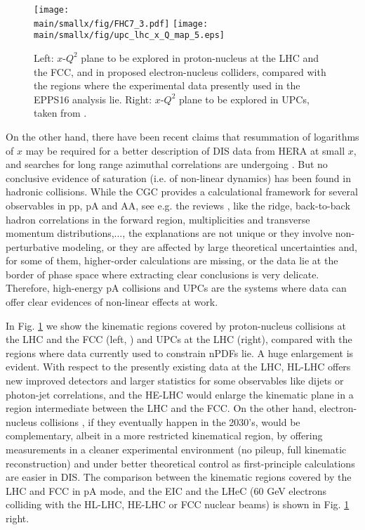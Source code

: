 \documentclass[../report.tex]{subfiles}
\providecommand{\main}{..}
\begin{document}
\begin{figure}[htb]
\centering
\texttt{[image: \\main/smallx/fig/FHC7\_3.pdf]} \hfill \texttt{[image: \\main/smallx/fig/upc\_lhc\_x\_Q\_map\_5.eps]}
\caption{Left: $x$-$Q^2$ plane to be explored in proton-nucleus at the LHC and the FCC, and in  proposed electron-nucleus colliders, compared with the regions where the experimental data presently used in the EPPS16 analysis \cite{Eskola:2016oht} lie. Right: $x$-$Q^2$ plane to be explored in UPCs, taken from \cite{Baltz:2007kq}.}
\label{fig:smallx1}
\end{figure}

On the other hand, there have been recent claims \cite{Ball:2017otu,Abdolmaleki:2018jln} that resummation of logarithms of $x$ may be required for a better description of DIS data from HERA at small $x$, and searches for long range azimuthal correlations are undergoing \cite{zeusichep2018}. But no conclusive evidence of saturation (i.e. of non-linear dynamics) has been found in hadronic collisions. While the CGC provides a calculational framework for several observables in pp, pA and AA, see e.g. the reviews \cite{Albacete:2013tpa,Lappi:2015jka}, like the ridge, back-to-back hadron correlations in the forward region, multiplicities and transverse momentum distributions,$\dots$,  the explanations are not unique or they involve non-perturbative modeling, or they are affected by large theoretical uncertainties and, for some of them, higher-order calculations are missing, or the data lie at the border of phase space where extracting clear conclusions is very delicate. Therefore, high-energy pA collisions and UPCs are the systems where data can offer clear evidences of non-linear effects at work.

In Fig. \ref{fig:smallx1} we show the kinematic regions covered by proton-nucleus collisions at the LHC and the FCC (left, \cite{Dainese:2016gch}) and UPCs at the LHC (right), compared with the regions where data currently used to constrain nPDFs lie. A huge enlargement is evident. With respect to the presently existing data at the LHC, HL-LHC offers new improved detectors and larger statistics for some observables like dijets or photon-jet correlations, and the HE-LHC would enlarge the kinematic plane in a region intermediate between the LHC and the FCC. On the other hand, electron-nucleus collisions \cite{AbelleiraFernandez:2012cc,Accardi:2012qut}, if they eventually happen in the 2030's, would be complementary, albeit in a more restricted kinematical region, by offering measurements in a cleaner experimental environment (no pileup, full kinematic reconstruction) and under better theoretical control as first-principle calculations are easier in DIS. The comparison between the kinematic regions covered by the LHC and FCC in pA mode, and the EIC \cite{Accardi:2012qut} and the LHeC \cite{AbelleiraFernandez:2012cc} (60 GeV electrons colliding with the HL-LHC, HE-LHC or FCC nuclear beams) is shown in Fig. \ref{fig:smallx1} right.
\end{document}
